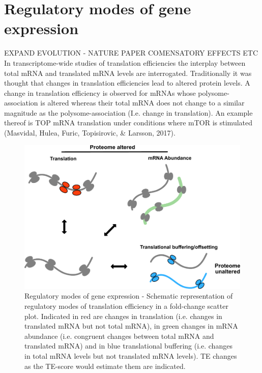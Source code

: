 \documentclass[12pt,openany]{book}
\begin{document}
\section{Regulatory modes of gene expression}

EXPAND EVOLUTION - NATURE PAPER COMENSATORY EFFECTS ETC In
transcriptome-wide studies of translation efficiencies the interplay
between total mRNA and translated mRNA levels are interrogated.
Traditionally it was thought that changes in translation efficiencies
lead to altered protein levels. A change in translation efficiency is
observed for mRNAs whose polysome-association is altered whereas their
total mRNA does not change to a similar magnitude as the
polysome-association (I.e. change in translation). An example thereof is
TOP mRNA translation under conditions where mTOR is stimulated
(Masvidal, Hulea, Furic, Topisirovic, \& Larsson, 2017).

\begin{figure}
  \includegraphics{./figures/geneModes_MRNA.pdf}
  \caption{Regulatory modes of gene expression - Schematic representation of regulatory modes of translation efficiency in a fold-change scatter plot. Indicated in red are changes in translation (i.e. changes in translated mRNA but not total mRNA), in green changes in mRNA abundance (i.e. congruent changes between total mRNA and translated mRNA) and in blue translational buffering (i.e. changes in total mRNA levels but not translated mRNA levels). TE changes as the TE-score would estimate them are indicated.\label{fig:mRNA}}
\end{figure}
\end{document}
